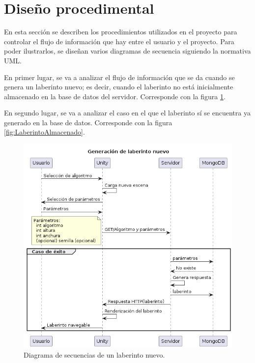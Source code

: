 \section{Diseño procedimental}
En esta sección se describen los procedimientos utilizados en el proyecto para controlar el flujo de información que hay entre el usuario y el proyecto. Para poder ilustrarlos, se diseñan varios diagramas de secuencia siguiendo la normativa UML. 

En primer lugar, se va a analizar el flujo de información que se da cuando se genera un laberinto nuevo; es decir, cuando el laberinto no está inicialmente almacenado en la base de datos del servidor. Corresponde con la figura \ref{fig:LaberintoNuevo}.

En segundo lugar, se va a analizar el caso en el que el laberinto sí se encuentra ya generado en la base de datos. Corresponde con la figura \ref{fig:LaberintoAlmacenado}.

\begin{figure}[H]
    \centering  
    \includegraphics[width=\textwidth]{img/LaberintoNuevo.png}  
    \caption{Diagrama de secuencias de un laberinto nuevo.}  
    \label{fig:LaberintoNuevo}
\end{figure}

